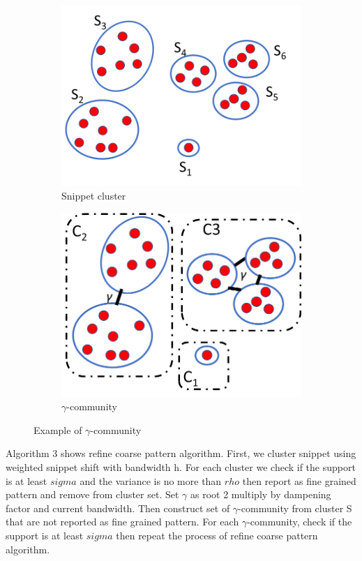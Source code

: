 \documentclass[conference]{IEEEtran}
\begin{document}
\begin{figure}[!h]
	\centering
	\begin{subfigure}[b]{0.4\linewidth}
		\includegraphics[width=\linewidth]{"cluster example"}
		\caption{Snippet cluster}
	\end{subfigure}
	\begin{subfigure}[b]{0.4\linewidth}
		\includegraphics[width=\linewidth]{"lamda community"}
		\caption{$\gamma$-community}
	\end{subfigure}
	\caption{Example of $\gamma$-community}
	\label{fig:lamda-community}
\end{figure}

Algorithm 3 shows refine coarse pattern algorithm. First, we cluster snippet using weighted snippet shift with bandwidth h. For each cluster we check if the support is at least $sigma$ and the variance is no more than $rho$ then report as fine grained pattern and remove from cluster set. Set $\gamma$ as root 2 multiply by dampening factor and current bandwidth. Then construct set of $\gamma$-community from cluster S that are not reported as fine grained pattern. For each $\gamma$-community, check if the support is at least $sigma$ then repeat the process of refine coarse pattern algorithm. 
\end{document}
